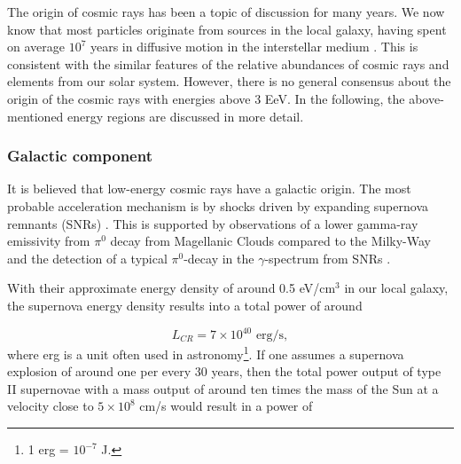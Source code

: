 The origin of cosmic rays has been a topic of discussion for many years. We now know that most particles originate from sources in the local galaxy, having spent on average $10^7$ years in diffusive motion in the interstellar medium \cite{Gaisser:2013bla}. This is consistent with the similar features of the relative abundances of cosmic rays and elements from our solar system. However, there is no general consensus about the origin of the cosmic rays with energies above 3 EeV. In the following, the above-mentioned energy regions are discussed in more detail.




\subsubsection{Galactic component}
\label{subsubsec:galactic}
It is believed that low-energy cosmic rays have a galactic origin. The most probable acceleration mechanism is by shocks driven by expanding supernova remnants (SNRs) \cite{0034-4885-64-4-201}. This is supported by observations of a lower gamma-ray emissivity from $\pi^0$ decay from Magellanic Clouds compared to the Milky-Way \cite{Fermi-LAT:2010fcp} and the detection of a typical $\pi^0$-decay in the $\gamma$-spectrum from SNRs \cite{Ackermann:2013wqa}. 

With their approximate energy density of around 0.5 eV/cm$^3$ in our local galaxy, the supernova energy density results into a total power of around

\begin{equation}
L_{CR} = 7 \times 10^{40} \textrm{ erg/s},
\end{equation}
where erg is a unit often used in astronomy\footnote{1 erg = $10^{-7}$ J.}. If one assumes a supernova explosion of around one per every 30 years, then the total power output of type II supernovae with a mass output of around ten times the mass of the Sun at a velocity close to $5 \times 10^{8}$ cm/s would result in a power of


